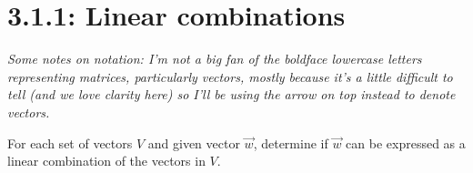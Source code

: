 \documentclass{article}
\begin{document}
\section*{3.1.1: Linear combinations}
\textit{Some notes on notation: I'm not a big fan of the boldface lowercase letters representing matrices, particularly vectors, mostly because it's a little difficult to tell (and we love 
clarity here) so I'll be using the arrow on top instead to denote vectors.}\par
\begin{center}
    \colorbox{CornflowerBlue!50}{
    \begin{minipage}[c]{0.9\textwidth}
        \centering
        For each set of vectors \(V\) and given vector \(\overrightarrow{w}\), determine if \(\overrightarrow{w}\) can be expressed as a linear combination of the vectors in \(V\). 
    \end{minipage}
    }
\end{center}
\end{document}
